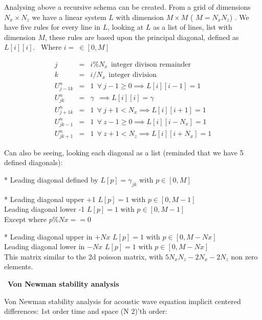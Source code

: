\documentclass[legalpaper, 12pt]{article}
\begin{document}
Analysing above a recursive schema can be created. From a grid of dimensions $ N_x \times N_z $ we have a linear system $L$ with dimension $ M \times M $ ( $ M = N_x N_z $) . We have five rules for every line in $ L $, looking at $ L $ as a list of lines, list with dimension $ M $, these rules are based upon the principal diagonal, defined as $L[i][i]$.
\newline
\ 
Where $ i = \ \in [0, M] $

\begin{eqnarray}
	j &=& i \% N_x \nonumber \ \  \mbox{integer divison remainder} \\ 
	k &=& i / N_x \nonumber \ \ \mbox{integer division} \\
	U_{j-1k}^n &=& 1 \ \ \forall \ j-1 \geq 0 \implies L[i][i-1] = 1 \nonumber \\
	U_{jk}^n &=&  \gamma \ \ \implies L[i][i] = \gamma \nonumber \\
	U_{j+1k}^n &=& 1 \ \ \forall \ j+1 < N_x \implies L[i][i+1] = 1 \nonumber \\
	U_{jk-1}^n &=& 1 \ \ \forall \ z-1 \geq 0 \implies L[i][i-N_x] = 1 \nonumber \\
	U_{jk+1}^n &=& 1 \ \ \forall \ z+1 < N_z \implies L[i][i+N_x] = 1 \nonumber 
\end{eqnarray}

Can also be seeing, looking each diagonal as a list (reminded that we have 5 defined diagonals): 

* Leading diagonal defined by $L[p] = \gamma_{jk}$ with $p \in [0, M] $

* Leading diagonal upper +1 $L[p] = 1$ with $p \in [0, M-1] $ \\
   Leading diagonal lower -1  $L[p] = 1$ with $p \in [0, M-1] $ \\
   Except where $ p \%Nx == 0 $

* Leading diagonal upper in $+Nx$ $L[p] = 1$ with $p \in [0, M-Nx] $ \\
   Leading diagonal lower in $-Nx$  $L[p] = 1$ with $p \in [0, M-Nx] $ \\
   
This matrix similar to the 2d poisson matrix, with $5N_xN_z-2N_x-2N_z$ non zero elements. 


\newpage

\
\textbf{Von Newman stability analysis}

Von Newman stability analysis for acoustic wave equation implicit centered differences: 1st order time and space (N 2)'th order:
\end{document}
